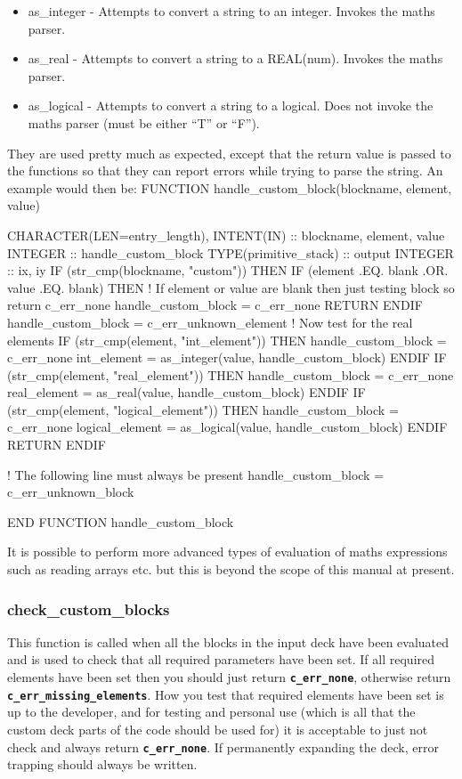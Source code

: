 \documentclass[12pt,a4paper]{article}
\newcommand{\inlinecode}[1]{{\color{warwickred} \bf\texttt{#1}}}
\newenvironment{boxverbatim}{\lboxverbatim{none}}{\endlboxverbatim}
\begin{document}
\begin{itemize}
\item as\_integer - Attempts to convert a string to an integer. Invokes the
  maths parser.
\item as\_real - Attempts to convert a string to a REAL(num). Invokes the maths
  parser.
\item as\_logical - Attempts to convert a string to a logical. Does not invoke
  the maths parser (must be either ``T'' or ``F'').
\end{itemize}

They are used pretty much as expected, except that the return value is passed
to the functions so that they can report errors while trying to parse the
string. An example would then be:
\begin{boxverbatim}
FUNCTION handle_custom_block(blockname, element, value)

  CHARACTER(LEN=entry_length), INTENT(IN) :: blockname, element, value
  INTEGER :: handle_custom_block
  TYPE(primitive_stack) :: output
  INTEGER :: ix, iy
  IF (str_cmp(blockname, "custom")) THEN
    IF (element .EQ. blank .OR. value .EQ. blank) THEN
      ! If element or value are blank then just testing block so return c_err_none
      handle_custom_block = c_err_none
      RETURN
    ENDIF
    handle_custom_block = c_err_unknown_element
    ! Now test for the real elements
    IF (str_cmp(element, "int_element")) THEN
      handle_custom_block = c_err_none
      int_element = as_integer(value, handle_custom_block)
    ENDIF
    IF (str_cmp(element, "real_element")) THEN
      handle_custom_block = c_err_none
      real_element = as_real(value, handle_custom_block)
    ENDIF
    IF (str_cmp(element, "logical_element")) THEN
      handle_custom_block = c_err_none
      logical_element = as_logical(value, handle_custom_block)
      ENDIF
    RETURN
  ENDIF

  ! The following line must always be present
  handle_custom_block = c_err_unknown_block

END FUNCTION handle_custom_block
\end{boxverbatim}

It is possible to perform more advanced types of evaluation of maths
expressions such as reading arrays etc. but this is beyond the scope of this
manual at present.

\subsubsection{check\_custom\_blocks}
This function is called when all the blocks in the input deck have been
evaluated and is used to check that all required parameters have been set. If
all required elements have been set then you should just return
\inlinecode{c\_err\_none}, otherwise return
\inlinecode{c\_err\_missing\_elements}. How you test that required elements have
been set is up to the developer, and for testing and personal use (which is
all that the custom deck parts of the code should be used for) it is
acceptable to just not check and always return \inlinecode{c\_err\_none}. If
permanently expanding the deck, error trapping should always be written.
\end{document}
